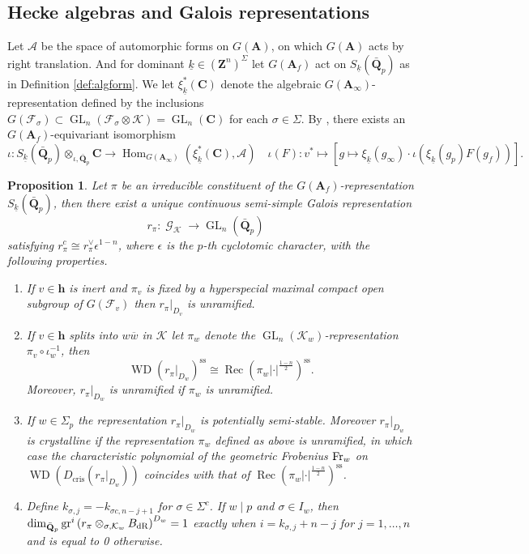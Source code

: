 \documentclass[leqno]{amsart}
\newtheorem{prop}[thm]{Proposition}
\theoremstyle{definition}
\theoremstyle{remark}
\newcommand{\Q}{{\mathbf{Q}}}
\newcommand{\Z}{{\mathbf{Z}}}
\newcommand{\C}{\mathbf C}
\newcommand{\A}{\mathbf A}
\newcommand{\finite}{\mathbf{h}}
\DeclareMathOperator{\Hom}{Hom}
\DeclareMathOperator{\GL}{GL}
\DeclareMathOperator{\Gal}{\mathcal{G}}
\DeclareMathOperator{\WD}{WD}
\DeclareMathOperator{\Rec}{Rec}
\newcommand{\Fr}{\textnormal{Fr}} %
\newcommand{\dR}{\textnormal{dR}}
\newcommand{\F}{{\mathcal{F}}} %
\newcommand{\K}{{\mathcal{K}}} %
\newcommand{\bw}{\overline{w}}
\newcommand{\wt}[1]{\underline{ #1 }}
\begin{document}
\subsection{Hecke algebras and Galois representations}

Let $\mathcal{A}$ be
the space of automorphic forms on $G(\A)$,
on which $G(\A)$ acts by right translation.
And for dominant $\wt{k}\in (\Z^n)^{\Sigma}$
let $G(\A_f)$ act on $S_{\wt{k}}(\bar{\Q}_p)$
as in Definition \ref{def:algform}.
We let $\xi_{\wt{k}}^*(\C)$
denote the algebraic
$G(\A_\infty)$-representation
defined by the inclusions
$G(\F_\sigma)\subset \GL_n(\F_\sigma\otimes \K)=\GL_n(\C)$
for each $\sigma\in\Sigma$.
By \cite[Prop 3.3.2]{CHT},
there exists an $G(\A_f)$-equivariant isomorphism
\begin{equation}\label{eq:p_to_infty}
	\iota\colon S_{\wt{k}}(\bar{\Q}_p)\otimes_{\iota,\bar{\Q}_p}\C
	\rightarrow \Hom_{G(\A_\infty)} (\xi_{\wt{k}}^*(\C), \mathcal{A})\quad
	\iota(F)\colon v^*\mapsto 
	[g\mapsto \xi_{\wt{k}}(g_\infty)\cdot 
    \iota\left(\xi_{\wt{k}}(g_p)F(g_f)\right)].
\end{equation}


\begin{prop}\cite[Prop.2.27]{ger}\label{prop:gal_ger}
	Let $\pi$ be an irreducible constituent of the
	$G(\A_f)$-representation $S_{\wt{k}}(\bar{\Q}_p)$,
	then there exist a unique 
	continuous semi-simple Galois representation
	\[
	r_\pi: \Gal_\K \rightarrow \GL_n(\bar{\Q}_p)\quad
	\]
    satisfying $r_\pi^c \cong r_\pi^{\vee} \epsilon^{1-n}$,
	where $\epsilon$ is the $p$-th cyclotomic character,
	with the following properties.
\begin{enumerate}[label=(\alph*)]
\item If $v\in \finite$ is inert and $\pi_v$
is fixed by a hyperspecial maximal compact open subgroup 
of $G(\F_v)$ then $r_\pi\vert_{D_v}$ is unramified.
\item If $v\in \finite$ splits into $w\bw$ in $\K$
let $\pi_w$ denote the $\GL_n(\K_w)$-representation
$\pi_v\circ \iota_w^{-1}$, then
\[
\WD\left(\left.r_\pi\right|_{D_w}\right)^{\mathrm{ss}} \cong
\Rec(\pi_w|\cdot|^{\frac{1-n}{2}})^{\mathrm{ss}}.
\]
Moreover, $r_\pi\vert_{D_w}$ is unramified if $\pi_w$ is unramified.
\item 
If $w\in\Sigma_p$ the representation
$r_\pi\vert_{D_w}$ is potentially semi-stable.
Moreover $r_\pi\vert_{D_w}$ is crystalline
if the representation $\pi_w$ defined as above is unramified,
in which case the characteristic polynomial of 
the geometric Frobenius $\Fr_w$ on 
$\WD\left(D_{\mathrm{cris }}\left(\left.r_\pi\right|_{D_w}\right)\right)$
coincides with that of 
$\Rec(\pi_w|\cdot|^{\frac{1-n}{2}})^{\mathrm{ss}}$.
\item 
Define $k_{\sigma,j}=-k_{\sigma c, n-j+1}$ for $\sigma\in \Sigma^c$.
If $w\mid p$ and  $\sigma\in I_w$, then 
$\dim_{\bar{\Q}_p}\operatorname{gr}^i
\left(r_\pi \otimes_{\sigma, \K_w} B_{\dR}\right)^{D_w}=1$
exactly when $i=k_{\sigma, j}+n-j$ 
for $j=1, \ldots, n$ and is equal to 0 otherwise.
\end{enumerate}
\end{prop}
\end{document}

